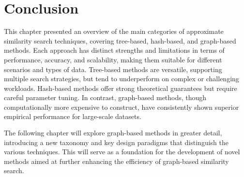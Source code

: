\section{Conclusion}

\noindent This chapter presented an overview of the main categories of approximate similarity search techniques, covering tree-based, hash-based, and graph-based methods. Each approach has distinct strengths and limitations in terms of performance, accuracy, and scalability, making them suitable for different scenarios and types of data. Tree-based methods are versatile, supporting multiple search strategies, but tend to underperform on complex or challenging workloads. Hash-based methods offer strong theoretical guarantees but require careful parameter tuning. In contrast, graph-based methods, though computationally more expensive to construct, have consistently shown superior empirical performance for large-scale datasets.

The following chapter will explore graph-based methods in greater detail, introducing a new taxonomy and key design paradigms that distinguish the various techniques. This will serve as a foundation for the development of novel methods aimed at further enhancing the efficiency of graph-based similarity search.
